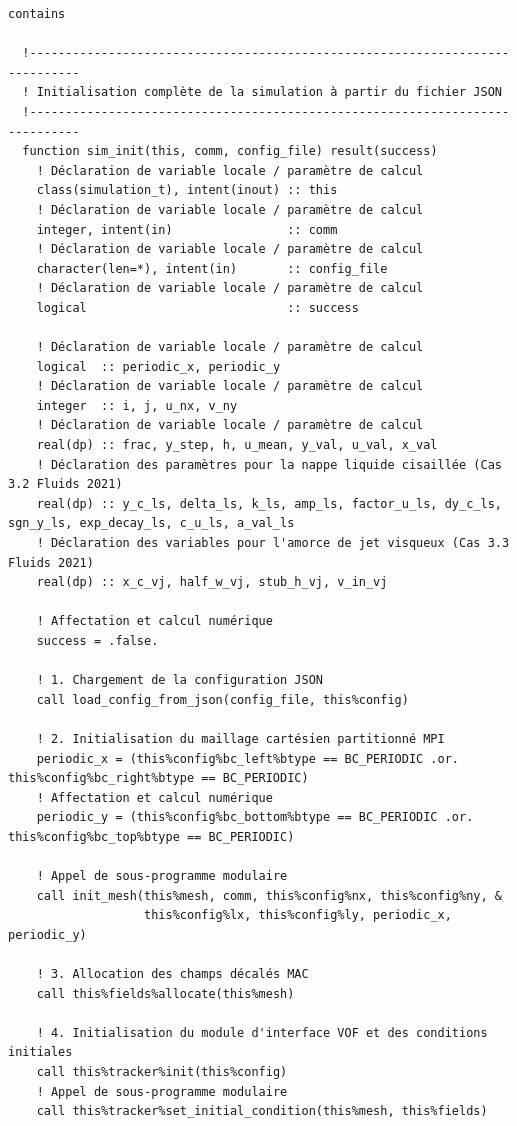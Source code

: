 \documentclass[10pt,a4paper,oneside]{book}
\begin{document}
\begin{lstlisting}[language={[95]Fortran}]
contains

  !-----------------------------------------------------------------------------
  ! Initialisation complète de la simulation à partir du fichier JSON
  !-----------------------------------------------------------------------------
  function sim_init(this, comm, config_file) result(success)
    ! Déclaration de variable locale / paramètre de calcul
    class(simulation_t), intent(inout) :: this
    ! Déclaration de variable locale / paramètre de calcul
    integer, intent(in)                :: comm
    ! Déclaration de variable locale / paramètre de calcul
    character(len=*), intent(in)       :: config_file
    ! Déclaration de variable locale / paramètre de calcul
    logical                            :: success

    ! Déclaration de variable locale / paramètre de calcul
    logical  :: periodic_x, periodic_y
    ! Déclaration de variable locale / paramètre de calcul
    integer  :: i, j, u_nx, v_ny
    ! Déclaration de variable locale / paramètre de calcul
    real(dp) :: frac, y_step, h, u_mean, y_val, u_val, x_val
    ! Déclaration des paramètres pour la nappe liquide cisaillée (Cas 3.2 Fluids 2021)
    real(dp) :: y_c_ls, delta_ls, k_ls, amp_ls, factor_u_ls, dy_c_ls, sgn_y_ls, exp_decay_ls, c_u_ls, a_val_ls
    ! Déclaration des variables pour l'amorce de jet visqueux (Cas 3.3 Fluids 2021)
    real(dp) :: x_c_vj, half_w_vj, stub_h_vj, v_in_vj

    ! Affectation et calcul numérique
    success = .false.

    ! 1. Chargement de la configuration JSON
    call load_config_from_json(config_file, this%config)

    ! 2. Initialisation du maillage cartésien partitionné MPI
    periodic_x = (this%config%bc_left%btype == BC_PERIODIC .or. this%config%bc_right%btype == BC_PERIODIC)
    ! Affectation et calcul numérique
    periodic_y = (this%config%bc_bottom%btype == BC_PERIODIC .or. this%config%bc_top%btype == BC_PERIODIC)

    ! Appel de sous-programme modulaire
    call init_mesh(this%mesh, comm, this%config%nx, this%config%ny, &
                   this%config%lx, this%config%ly, periodic_x, periodic_y)

    ! 3. Allocation des champs décalés MAC
    call this%fields%allocate(this%mesh)

    ! 4. Initialisation du module d'interface VOF et des conditions initiales
    call this%tracker%init(this%config)
    ! Appel de sous-programme modulaire
    call this%tracker%set_initial_condition(this%mesh, this%fields)


\end{lstlisting}
\end{document}
